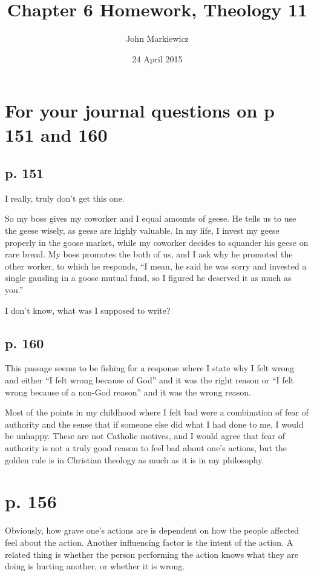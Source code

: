 \documentclass[12pt]{article}
\begin{document}
\title{Chapter 6 Homework, Theology 11}
\author{John Markiewicz}
\date{24 April 2015}
\maketitle
\section{For your journal questions on p 151 and 160}
\subsection{p. 151}
	I really, truly don't get this one.

	So my boss gives my coworker and I equal amounts of geese.  He tells
	us to use the geese wisely, as geese are highly valuable.  In my life,
	I invest my geese properly in the goose market, while my coworker
	decides to squander his geese on rare bread.  My boss promotes the both
	of us, and I ask why he promoted the other worker, to which he responds,
	``I mean, he said he was sorry and invested a single gausling in a 
	goose mutual fund, so I figured he deserved it as much as you.''

	I don't know, what was I supposed to write?

\subsection{p. 160}
	This passage seems to be fishing for a response where I state why I 
	felt wrong and either ``I felt wrong because of God'' and it was the
	right reason or ``I felt wrong because of a non-God reason'' and it 
	was the wrong reason.

	Most of the points in my childhood where I felt bad were a combination
	of fear of authority and the sense that if someone else did what I had
	done to me, I would be unhappy.  These are not Catholic motives, and I 
	would agree that fear of authority is not a truly good reason to feel
	bad about one's actions, but the golden rule is in Christian theology
	as much as it is in my philosophy.

\section{p. 156}
	Obviously, how grave one's actions are is dependent on how the people
	affected feel about the action.  Another influencing factor is the
	intent of the action.  A related thing is whether the person performing
	the action knows what they are doing is hurting another, or whether it
	is wrong.
\end{document}
